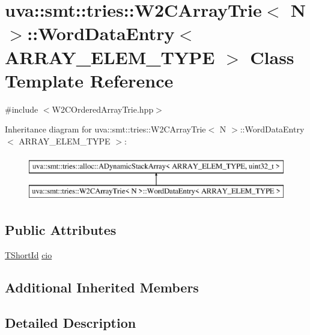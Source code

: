 \hypertarget{classuva_1_1smt_1_1tries_1_1_w2_c_array_trie_1_1_word_data_entry}{}\section{uva\+:\+:smt\+:\+:tries\+:\+:W2\+C\+Array\+Trie$<$ N $>$\+:\+:Word\+Data\+Entry$<$ A\+R\+R\+A\+Y\+\_\+\+E\+L\+E\+M\+\_\+\+T\+Y\+P\+E $>$ Class Template Reference}
\label{classuva_1_1smt_1_1tries_1_1_w2_c_array_trie_1_1_word_data_entry}


{\ttfamily \#include $<$W2\+C\+Ordered\+Array\+Trie.\+hpp$>$}

Inheritance diagram for uva\+:\+:smt\+:\+:tries\+:\+:W2\+C\+Array\+Trie$<$ N $>$\+:\+:Word\+Data\+Entry$<$ A\+R\+R\+A\+Y\+\_\+\+E\+L\+E\+M\+\_\+\+T\+Y\+P\+E $>$\+:\begin{figure}[H]
\begin{center}
\leavevmode
\includegraphics[height=2.000000cm]{classuva_1_1smt_1_1tries_1_1_w2_c_array_trie_1_1_word_data_entry}
\end{center}
\end{figure}
\subsection*{Public Attributes}
\begin{DoxyCompactItemize}
\item 
\hyperlink{namespaceuva_1_1smt_1_1hashing_adcf22e1982ad09d3a63494c006267469}{T\+Short\+Id} \hyperlink{classuva_1_1smt_1_1tries_1_1_w2_c_array_trie_1_1_word_data_entry_a7d16cf9f12d4a9f475645aa0fd177ee1}{cio}
\end{DoxyCompactItemize}
\subsection*{Additional Inherited Members}


\subsection{Detailed Description}
